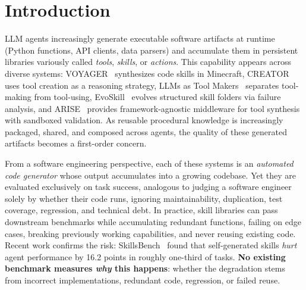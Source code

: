 \documentclass[sigplan,nonacm,natbib=false]{acmart}
\begin{document}
\begin{abstract}
artifact gallery, and a skill-bundle evaluation track for systems that emit Anthropic-Claude-Skills-style multi-file artifacts. The contribution is a diagnostic methodology for the next phase of self-evolving agents, not a leaderboard.
\end{abstract}

\maketitle

\section{Introduction}

LLM agents increasingly generate executable software artifacts at runtime (Python functions, API clients, data parsers) and accumulate them in persistent libraries variously called \emph{tools}, \emph{skills}, or \emph{actions}. This capability appears across diverse systems: VOYAGER~\cite{wang2023voyager} synthesizes code skills in Minecraft, CREATOR~\cite{qian2023creator} uses tool creation as a reasoning strategy, LLMs as Tool Makers~\cite{cai2023latm} separates tool-making from tool-using, EvoSkill~\cite{alzubi2026evoskill} evolves structured skill folders via failure analysis, and ARISE~\cite{kaliyev2026arise} provides framework-agnostic middleware for tool synthesis with sandboxed validation. As reusable procedural knowledge is increasingly packaged, shared, and composed across agents, the quality of these generated artifacts becomes a first-order concern.

From a software engineering perspective, each of these systems is an \emph{automated code generator} whose output accumulates into a growing codebase. Yet they are evaluated exclusively on task success, analogous to judging a software engineer solely by whether their code runs, ignoring maintainability, duplication, test coverage, regression, and technical debt. In practice, skill libraries can pass downstream benchmarks while accumulating redundant functions, failing on edge cases, breaking previously working capabilities, and never reusing existing code. Recent work confirms the risk: SkillsBench~\cite{skillsbench2026} found that self-generated skills \emph{hurt} agent performance by 16.2 points in roughly one-third of tasks. \textbf{No existing benchmark measures \emph{why} this happens}: whether the degradation stems from incorrect implementations, redundant code, regression, or failed reuse.
\end{document}
